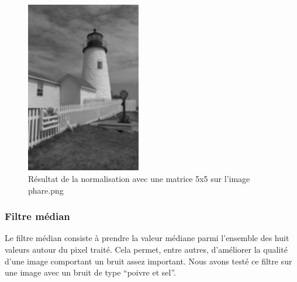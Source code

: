 \begin{figure}[H]
      \center
      \includegraphics[width=5cm]{ressources/tp4/phare_dest_5x5.png}
      \caption{Résultat de la normalisation avec une matrice 5x5 sur l'image phare.png}
\end{figure}

\subsubsection{Filtre médian}

Le filtre médian consiste à prendre la valeur médiane parmi l'ensemble des huit valeurs autour du pixel traité.
Cela permet, entre autres, d'améliorer la qualité d'une image comportant un bruit assez important. Nous avons testé
ce filtre sur une image avec un bruit de type ``poivre et sel''.

